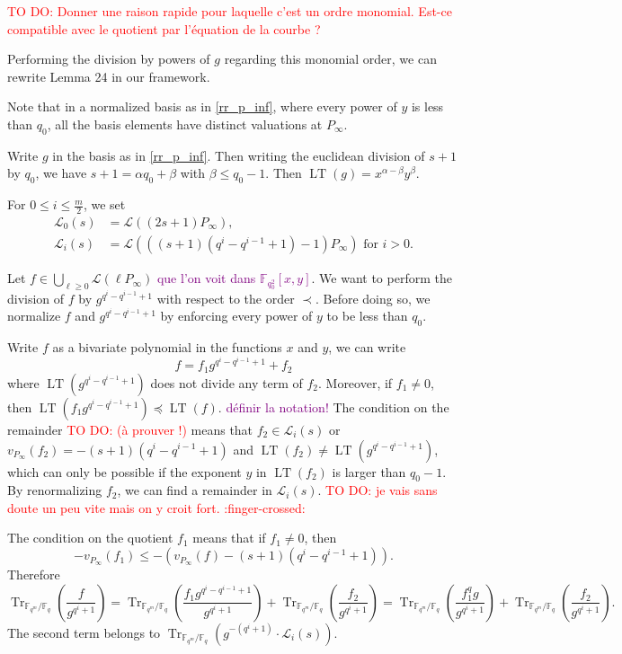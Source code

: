 \documentclass[a4paper]{article}
\newcommand{\calL}{\mathcal{L}}
\newcommand{\fq}{\mathbb{F}_{q}}
\newcommand{\F}{\mathbb{F}}
\newcommand{\Tr}[1]{\operatorname{Tr}_{\mathbb{F}_{q^m}/\fq}\left(#1\right)}
\newcommand{\LT}[1]{\operatorname{LT}\left(#1\right)}
\newcommand\jade[1]{\textcolor{purple}{#1}}
\newcommand\TODO[1]{\textcolor{red}{TO DO: #1}}
\begin{document}
\TODO{Donner une raison rapide pour laquelle c'est un ordre monomial. Est-ce compatible avec le quotient par l'équation de la courbe ?}

Performing the division by powers of $g$ regarding this monomial order, we can rewrite Lemma 24 \cite{rocco} in our framework.

Note that in a normalized basis as in \eqref{rr_p_inf}, where every power of $y$ is less than $q_0$, all the basis elements have distinct valuations at $P_\infty$.


Write $g$ in the basis as in \eqref{rr_p_inf}. Then writing the euclidean division of $s+1$ by $q_0$, we have $s+1=\alpha q_0 +\beta$ with $\beta \leq q_0-1$. Then $\LT{g}=x^{\alpha-\beta}y^\beta$.

For $0\leq i \leq \frac{m}{2}$, we set
\begin{align*}
	\calL_0(s)&=\calL\left((2s+1)P_\infty\right),\\
	\calL_i(s)&=\calL\left(((s+1)(q^i-q^{i-1}+1)-1)P_\infty\right) \text{ for } i > 0.
\end{align*}



Let $f \in \bigcup_{\ell \geq 0} \calL(\ell P_\infty)$ \jade{que l'on voit dans $\F_{q_0^2}[x,y]$}. We want to perform the division of $f$ by $g^{q^i-q^{i-1}+1}$ with respect to the order $\prec$. Before doing so, we normalize $f$ and $g^{q^i-q^{i-1}+1}$ by enforcing every power of $y$ to be less than $q_0$.
	
Write $f$ as a bivariate polynomial in the functions $x$ and $y$, we can write
	 \[f=f_1 g^{q^i-q^{i-1}+1} +f_2\]
	 where $\LT{g^{q^i-q^{i-1}+1}}$ does not divide any term of $f_2$. Moreover, if $f_1 \neq 0$, then $\LT{f_1 g^{q^i-q^{i-1}+1}} \preceq \LT{f}$. \jade{définir la notation!}
	The condition on the remainder \TODO{(à prouver !)} means that $f_2 \in \calL_i(s)$ or $v_{P_\infty}(f_2) = - (s+1)(q^i-q^{i-1}+1)$ and $\LT{f_2}\neq \LT{g^{q^i-q^{i-1}+1}}$, which can only be possible if the exponent $y$ in $\LT{f_2}$ is larger than $q_0-1$. By renormalizing $f_2$, we can find a remainder in $\calL_i(s)$. \TODO{je vais sans doute un peu vite mais on y croit fort. :finger-crossed:} 
	
	The condition on the quotient $f_1$ means that if $f_1 \neq 0$, then 
\[	-v_{P_\infty}(f_1) \leq - \left(v_{P_\infty}(f)- (s+1)(q^i-q^{i-1}+1)\right).\]
Therefore
\[\Tr{\frac{f}{g^{q^i+1}}}=\Tr{\frac{f_1 g^{q^i-q^{i-1}+1}}{g^{q^i+1}}} +\Tr{\frac{f_2}{g^{q^i+1}}}= \Tr{\frac{f_1^qg}{g^{q^i+1}}} +\Tr{\frac{f_2}{g^{q^i+1}}}. \]
The second term belongs to $\Tr{g^{-(q^i+1)}\cdot \calL_i(s)}$.
\end{document}

